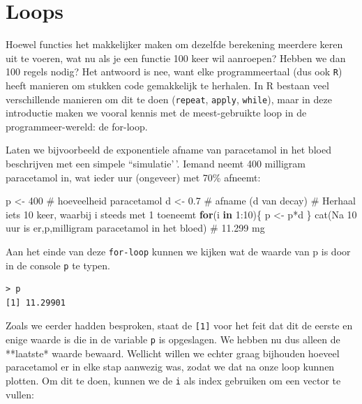 \documentclass[
  a4paper,
]{scrbook}
\newenvironment{Shaded}{\begin{snugshade}}{\end{snugshade}}
\newcommand{\CommentTok}[1]{\textcolor[rgb]{0.37,0.37,0.37}{#1}}
\newcommand{\ControlFlowTok}[1]{\textcolor[rgb]{0.00,0.23,0.31}{\textbf{#1}}}
\newcommand{\DecValTok}[1]{\textcolor[rgb]{0.68,0.00,0.00}{#1}}
\newcommand{\FloatTok}[1]{\textcolor[rgb]{0.68,0.00,0.00}{#1}}
\newcommand{\FunctionTok}[1]{\textcolor[rgb]{0.28,0.35,0.67}{#1}}
\newcommand{\NormalTok}[1]{\textcolor[rgb]{0.00,0.23,0.31}{#1}}
\newcommand{\OtherTok}[1]{\textcolor[rgb]{0.00,0.23,0.31}{#1}}
\newcommand{\SpecialCharTok}[1]{\textcolor[rgb]{0.37,0.37,0.37}{#1}}
\newcommand{\StringTok}[1]{\textcolor[rgb]{0.13,0.47,0.30}{#1}}
\theoremstyle{definition}
\theoremstyle{remark}
\begin{document}
\section{Loops}\label{loops}

Hoewel functies het makkelijker maken om dezelfde berekening meerdere
keren uit te voeren, wat nu als je een functie 100 keer wil aanroepen?
Hebben we dan 100 regels nodig? Het antwoord is nee, want elke
programmeertaal (dus ook \texttt{R}) heeft manieren om stukken code
gemakkelijk te herhalen. In R bestaan veel verschillende manieren om dit
te doen (\texttt{repeat}, \texttt{apply}, \texttt{while}), maar in deze
introductie maken we vooral kennis met de meest-gebruikte loop in de
programmeer-wereld: de for-loop.

Laten we bijvoorbeeld de exponentiele afname van paracetamol in het
bloed beschrijven met een simpele ``simulatie'\,'. Iemand neemt 400
milligram paracetamol in, wat ieder uur (ongeveer) met 70\% afneemt:

\begin{Shaded}
\begin{Highlighting}[]
\NormalTok{p }\OtherTok{\textless{}{-}} \DecValTok{400} \CommentTok{\# hoeveelheid paracetamol}
\NormalTok{d }\OtherTok{\textless{}{-}} \FloatTok{0.7} \CommentTok{\# afname (d van decay)}
\CommentTok{\# Herhaal iets 10 keer, waarbij \textquotesingle{}i\textquotesingle{} steeds met 1 toeneemt}
\ControlFlowTok{for}\NormalTok{(i }\ControlFlowTok{in} \DecValTok{1}\SpecialCharTok{:}\DecValTok{10}\NormalTok{)\{}
\NormalTok{  p }\OtherTok{\textless{}{-}}\NormalTok{ p}\SpecialCharTok{*}\NormalTok{d}
\NormalTok{\}}
\FunctionTok{cat}\NormalTok{(}\StringTok{\textquotesingle{}Na 10 uur is er\textquotesingle{}}\NormalTok{,p,}\StringTok{\textquotesingle{}milligram paracetamol in het bloed\textquotesingle{}}\NormalTok{) }\CommentTok{\# 11.299 mg}
\end{Highlighting}
\end{Shaded}

Aan het einde van deze \texttt{for-loop} kunnen we kijken wat de waarde
van p is door in de console \texttt{p} te typen.

\begin{verbatim}
> p
[1] 11.29901
\end{verbatim}

Zoals we eerder hadden besproken, staat de \texttt{{[}1{]}} voor het
feit dat dit de eerste en enige waarde is die in de variable \texttt{p}
is opgeslagen. We hebben nu dus alleen de **laatste* waarde bewaard.
Wellicht willen we echter graag bijhouden hoeveel paracetamol er in elke
stap aanwezig was, zodat we dat na onze loop kunnen plotten. Om dit te
doen, kunnen we de \texttt{i} als index gebruiken om een vector te
vullen:
\end{document}

